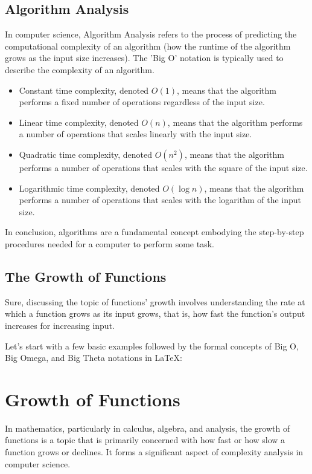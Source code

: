 \subsection{Algorithm Analysis}

In computer science, Algorithm Analysis refers to the process of predicting the computational complexity of an algorithm (how the runtime of the algorithm grows as the input size increases). The 'Big O' notation is typically used to describe the complexity of an algorithm.

\begin{itemize}
\item Constant time complexity, denoted $O(1)$, means that the algorithm performs a fixed number of operations regardless of the input size.
\item Linear time complexity, denoted $O(n)$, means that the algorithm performs a number of operations that scales linearly with the input size.
\item Quadratic time complexity, denoted $O(n^2)$, means that the algorithm performs a number of operations that scales with the square of the input size.
\item Logarithmic time complexity, denoted $O(\log n)$, means that the algorithm performs a number of operations that scales with the logarithm of the input size.
\end{itemize}

In conclusion, algorithms are a fundamental concept embodying the step-by-step procedures needed for a computer to perform some task.



\subsection{The Growth of Functions}
Sure, discussing the topic of functions' growth involves understanding the rate at which a function grows as its input grows, that is, how fast the function's output increases for increasing input.

Let's start with a few basic examples followed by the formal concepts of Big O, Big Omega, and Big Theta notations in LaTeX:



\section{Growth of Functions}

In mathematics, particularly in calculus, algebra, and analysis, the growth of functions is a topic that is primarily concerned with how fast or how slow a function grows or declines. It forms a significant aspect of complexity analysis in computer science.

